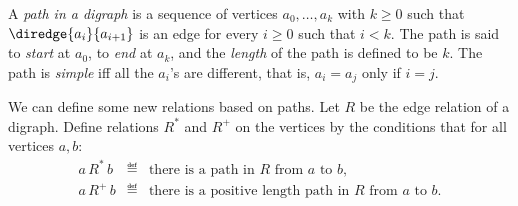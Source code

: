 \begin{definition}
A \emph{path in a digraph} is a sequence of vertices $a_0,\dots,a_k$ with
$k \ge 0$ such that $\diredge{a_i}{a_{i+1}}$ is an edge for every $i \geq
0$ such that $i < k$.  The path is said to \emph{start} at $a_0$, to
\emph{end} at $a_k$, and the \emph{length} of the path is defined to be
$k$.  The path is \emph{simple} iff all the $a_i$'s are different, that
is, $a_i = a_j$ only if $i=j$.
\end{definition}

We can define some new relations based on paths.  Let $R$ be the edge
relation of a digraph.  Define relations $R^*$ and $R^+$ on the vertices
by the conditions that for all vertices $a,b$:
\begin{eqnarray*}
a\, R^*\, b &\eqdef& \mbox{there is a path in $R$ from $a$ to $b$},\\
a\, R^+\, b &\eqdef& \mbox{there is a positive length path in $R$ from $a$ to $b$}.
\end{eqnarray*}

